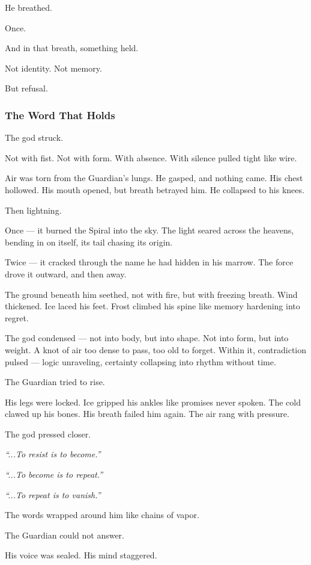 \documentclass[12pt]{article}
\begin{document}
He breathed.

Once.

And in that breath, something held.

Not identity. Not memory.

But refusal.

\dotfill

\subsubsection{The Word That Holds}

The god struck.

Not with fist. Not with form. With absence. With silence pulled tight like wire.

Air was torn from the Guardian’s lungs. He gasped, and nothing came. His chest hollowed. His mouth opened, but breath betrayed him. He collapsed to his knees.

Then lightning.

Once — it burned the Spiral into the sky. The light seared across the heavens, bending in on itself, its tail chasing its origin.

Twice — it cracked through the name he had hidden in his marrow. The force drove it outward, and then away.

The ground beneath him seethed, not with fire, but with freezing breath. Wind thickened. Ice laced his feet. Frost climbed his spine like memory hardening into regret.

The god condensed — not into body, but into shape. Not into form, but into weight. A knot of air too dense to pass, too old to forget. Within it, contradiction pulsed — logic unraveling, certainty collapsing into rhythm without time.

The Guardian tried to rise.

His legs were locked. Ice gripped his ankles like promises never spoken. The cold clawed up his bones. His breath failed him again. The air rang with pressure.

The god pressed closer.

\textit{“...To resist is to become.”}

\textit{“...To become is to repeat.”}

\textit{“...To repeat is to vanish.”}

The words wrapped around him like chains of vapor.

The Guardian could not answer.

His voice was sealed. His mind staggered.
\end{document}
